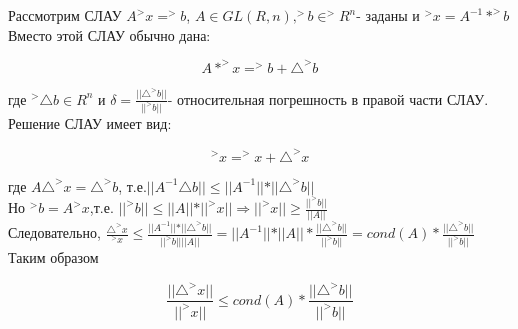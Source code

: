 \documentclass[__main__.tex]{subfiles}
\begin{document}
\begin{definition}
	Рассмотрим СЛАУ $A ^>x = ^>b$, $A\in GL(R,n), ^>b\in ^>R^n$- заданы и $^>x=A^{-1}* ^>b$\\
	Вместо этой СЛАУ обычно дана:
	
	$$A* ^>x= ^>b + \triangle^> b$$
	
	где $^>\triangle b \in R^n$ и $\delta=\frac{\vert\vert\triangle^> b\vert\vert}{\vert\vert ^>b\vert\vert}$- относительная погрешность в правой части СЛАУ.\\
	Решение СЛАУ имеет вид:
	
	$$^>x=^>x + \triangle^> x$$
	
	где $A \triangle^> x=  \triangle^> b$, т.е.$\vert\vert A^{-1} \triangle b \vert\vert \leq \vert\vert A^{-1}\vert\vert *\vert\vert \triangle^> b\vert\vert$\\
	Но $^>b=A ^>x$,т.е. $\vert\vert ^>b\vert\vert \leq \vert\vert A\vert\vert*\vert\vert^>x\vert\vert \Rightarrow \vert\vert ^>x\vert\vert \geq \frac{\vert\vert^>b\vert\vert}{\vert\vert A \vert\vert}$\\
	Следовательно, $\frac{\triangle^> x}{^>x}\leq \frac{\vert\vert A^{-1}\vert\vert * \vert\vert \triangle^> b \vert\vert}{\vert\vert ^>b \vert\vert \vert\vert A\vert\vert}=\vert\vert A^{-1}\vert\vert * \vert\vert A \vert\vert * \frac{\vert\vert \triangle^> b\vert\vert}{\vert\vert ^>b \vert\vert}= cond(A)*\frac{\vert\vert \triangle^> b\vert\vert}{\vert\vert ^>b \vert\vert}$\\
	Таким образом 
	
	$$\frac{\vert\vert  \triangle^> x \vert\vert}{\vert\vert ^>x\vert\vert}\leq cond(A)*\frac{\vert\vert \triangle^> b\vert\vert}{\vert\vert ^>b \vert\vert}$$
\end{definition}
\end{document}
